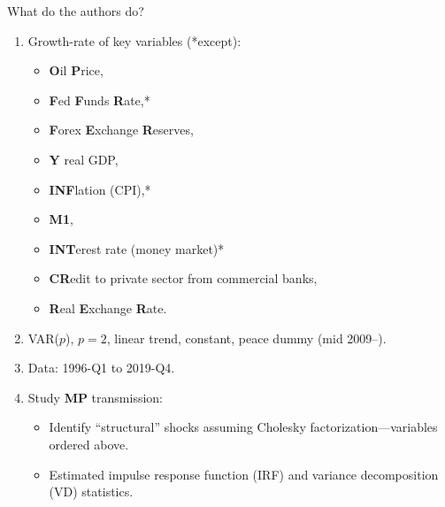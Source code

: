 \documentclass[10pt,english,slidetop,compress,
              blue,mathserif,color=option]{beamer}
\theoremstyle{plain}
\theoremstyle{definition}
\begin{document}
\begin{frame}{What do the authors do?}
  \begin{enumerate}
    \item Growth-rate of key variables (*except): 
      \begin{itemize}
        \item \textbf{O}il \textbf{P}rice, 
        \item \textbf{F}ed \textbf{F}unds \textbf{R}ate,* 
        \item \textbf{F}orex \textbf{E}xchange \textbf{R}eserves, 
        \item \textbf{Y} real GDP,
        \item \textbf{INF}lation (CPI),*
        \item \textbf{M1},
        \item \textbf{INT}erest rate (money market)*
        \item \textbf{CR}edit to private sector from commercial banks,
        \item \textbf{R}eal \textbf{E}xchange \textbf{R}ate.
      \end{itemize}
    \item VAR($p$), $p=2$, linear trend, constant, peace dummy (mid 2009--).
    \item Data: 1996-Q1 to 2019-Q4.
    \item Study \textbf{MP} transmission:
      \begin{itemize}
        \item Identify ``structural'' shocks assuming Cholesky factorization---variables ordered above.
        \item Estimated impulse response function (IRF) and variance decomposition (VD) statistics.
      \end{itemize}
  \end{enumerate}
\end{frame}
\end{document}
